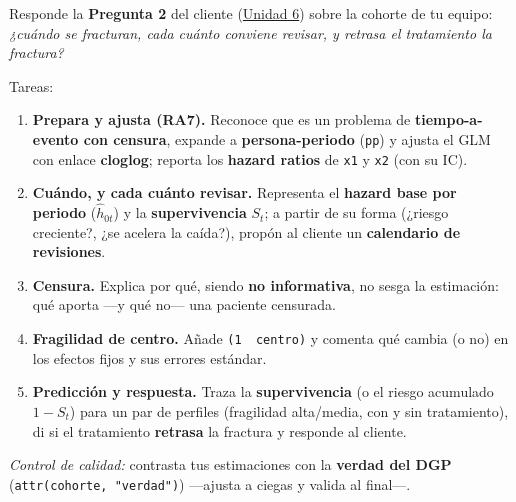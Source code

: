 \documentclass[
  letterpaper,
  DIV=11,
  numbers=noendperiod]{scrartcl}
\providecommand{\tightlist}{%
  \setlength{\itemsep}{0pt}\setlength{\parskip}{0pt}}\usepackage{longtable,booktabs,array}
\begin{document}
\begin{tcolorbox}[enhanced jigsaw, breakable, colframe=quarto-callout-important-color-frame, left=2mm, arc=.35mm, colbacktitle=quarto-callout-important-color!10!white, toprule=.15mm, colback=white, coltitle=black, rightrule=.15mm, opacitybacktitle=0.6, title=\textcolor{quarto-callout-important-color}{\faExclamation}\hspace{0.5em}{Tarea del estudiante (1.5) --- resuelve la Pregunta 2 del caso}, titlerule=0mm, toptitle=1mm, bottomtitle=1mm, leftrule=.75mm, bottomrule=.15mm, opacityback=0]

Responde la \textbf{Pregunta 2} del cliente
(\protect\hyperlink{sec-u16}{Unidad 6}) sobre la cohorte de tu equipo:
\emph{¿cuándo se fracturan, cada cuánto conviene revisar, y retrasa el
tratamiento la fractura?}

Tareas:

\begin{enumerate}
\def\labelenumi{\arabic{enumi}.}
\tightlist
\item
  \textbf{Prepara y ajusta (RA7).} Reconoce que es un problema de
  \textbf{tiempo-a-evento con censura}, expande a
  \textbf{persona-periodo} (\texttt{pp}) y ajusta el GLM con enlace
  \textbf{cloglog}; reporta los \textbf{hazard ratios} de \texttt{x1} y
  \texttt{x2} (con su IC).
\item
  \textbf{Cuándo, y cada cuánto revisar.} Representa el \textbf{hazard
  base por periodo} (\(\hat h_{0t}\)) y la \textbf{supervivencia}
  \(S_t\); a partir de su forma (¿riesgo creciente?, ¿se acelera la
  caída?), propón al cliente un \textbf{calendario de revisiones}.
\item
  \textbf{Censura.} Explica por qué, siendo \textbf{no informativa}, no
  sesga la estimación: qué aporta ---y qué no--- una paciente censurada.
\item
  \textbf{Fragilidad de centro.} Añade \texttt{(1\ \textbar{}\ centro)}
  y comenta qué cambia (o no) en los efectos fijos y sus errores
  estándar.
\item
  \textbf{Predicción y respuesta.} Traza la \textbf{supervivencia} (o el
  riesgo acumulado \(1-S_t\)) para un par de perfiles (fragilidad
  alta/media, con y sin tratamiento), di si el tratamiento
  \textbf{retrasa} la fractura y responde al cliente.
\end{enumerate}

\emph{Control de calidad:} contrasta tus estimaciones con la
\textbf{verdad del DGP} (\texttt{attr(cohorte,\ "verdad")}) ---ajusta a
ciegas y valida al final---.

\end{tcolorbox}
\end{document}

